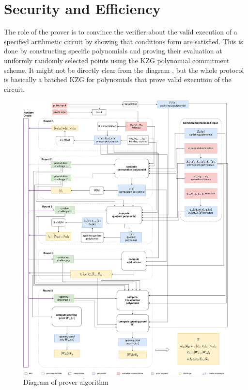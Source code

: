 \chapter{Security and Efficiency}
\label{chap:4}

The role of the prover is to convince the verifier about the valid execution of a specified arithmetic circuit by showing that conditions form  are satisfied. This is done by constructing specific polynomials and proving their evaluation at uniformly randomly selected points using the KZG polynomial commitment scheme. It might not be directly clear from the diagram , but the whole protocol is basically a batched KZG for polynomials that prove valid execution of the circuit.

\begin{figure}
    \centering
    \includegraphics[width=1\linewidth]{round-figures/prover-algorithm.drawio.png}
    \caption{Diagram of prover algorithm}
    \label{fig:full-diagram}
\end{figure}

